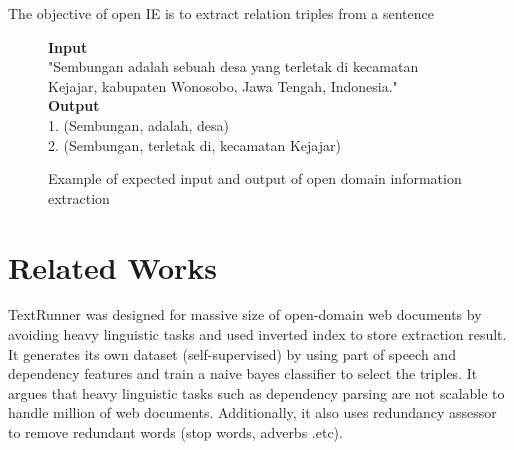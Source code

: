 \documentclass[conference,compsoc]{IEEEtran}
\begin{document}
The objective of open IE is to extract relation triples from a sentence




\lipsum[1-2]

\begin{figure}
\textbf{Input} \\[0.1cm]
"Sembungan adalah sebuah desa yang terletak di kecamatan Kejajar, kabupaten Wonosobo, Jawa Tengah, Indonesia." \\[0.5cm]
\textbf{Output} \\[0.1cm]
1. (Sembungan, adalah, desa) \\
2. (Sembungan, terletak di, kecamatan Kejajar) \\
\caption{Example of expected input and output of open domain information extraction}
\label{fig_example_io_openie}
\end{figure}

\section{Related Works}

TextRunner was designed for massive size of open-domain web documents by avoiding heavy linguistic tasks and used inverted index to store extraction result\cite{banko2007open}. It generates its own dataset (self-supervised) by using part of speech and dependency features and train a naive bayes classifier to select the triples. It argues that heavy linguistic tasks such as dependency parsing are not scalable to handle million of web documents. Additionally, it also uses redundancy assessor to remove redundant words (stop words, adverbs .etc).
\end{document}
